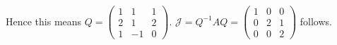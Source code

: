 \begin{Exercise}
\begin{enumerate}[(a)]
\begin{solution}
			Hence this means $Q = \begin{pmatrix}
			1 & 1 & 1 \\
			2 & 1 & 2 \\
			1 & -1 & 0
			\end{pmatrix}$. $\mathcal{J} = Q^{-1} A Q = \begin{pmatrix}
			1 & 0 & 0 \\
			0 & 2 & 1 \\
			0 & 0 & 2
			\end{pmatrix}$ follows.
		\end{solution}
	\end{enumerate}
\end{Exercise}